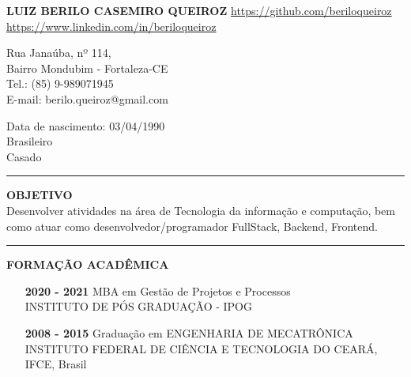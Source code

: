 \documentclass[12pt, a4paper]{article}
\newcommand{\LlinhaG}{2pt} %
\newcommand{\TlinhaG}{17cm}  %
\begin{document}

\begin{center}
	\fontsize{14}{14}
	\textbf{LUIZ BERILO CASEMIRO QUEIROZ}
	\url{https://github.com/beriloqueiroz}
	\url{https://www.linkedin.com/in/beriloqueiroz}

\end{center}

\begin{multicols}{2}
	\begin{flushleft}
		Rua Janaúba, nº 114,\\
		Bairro Mondubim - Fortaleza-CE\\
		Tel.: (85) 9-989071945\\
		E-mail: berilo.queiroz@gmail.com
	\end{flushleft}
	\vfill
	\begin{flushright}
		Data de nascimento: 03/04/1990\\
		Brasileiro\\
		Casado\\
	\end{flushright}
\end{multicols}


\begin{center} %
	\rule{\TlinhaG}{\LlinhaG}
\end{center}

\begin{center}
	\textbf{OBJETIVO}\\
	Desenvolver atividades na área de Tecnologia da informação e computação, bem como atuar como desenvolvedor/programador FullStack, Backend, Frontend.
\end{center}

\begin{center}	%
	\rule{\TlinhaG}{\LlinhaG}
\end{center}


\begin{center}
	\textbf{FORMAÇÃO ACADÊMICA}\\
\end{center}
\begin{itemize}
	\item[\textbf{2020 - 2021}] MBA em Gestão de Projetos e Processos\\
		INSTITUTO DE PÓS GRADUAÇÃO - IPOG
	\item[\textbf{2008 - 2015}] Graduação em ENGENHARIA DE MECATRÔNICA\\
		INSTITUTO FEDERAL DE CIÊNCIA E TECNOLOGIA DO CEARÁ, IFCE, Brasil\\
\end{itemize}
\end{document}
